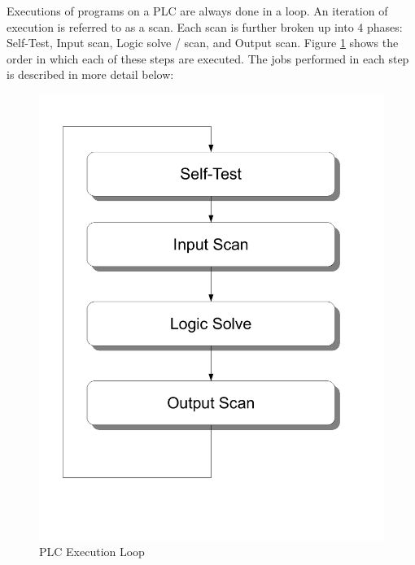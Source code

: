 \pagebreak
Executions of programs on a PLC are always done in a loop. An iteration of execution is referred to as a scan. Each scan is further broken up into 4 phases: Self-Test, Input scan, Logic solve / scan, and Output scan. Figure \ref{fig:plcexecution} shows the order in which each of these steps are executed. The jobs performed in each step is described in more detail below:
\begin{figure}[htb]
    \centering
    \includegraphics[width=\imgmedphoto]{./images/plcexecution.pdf}
    \caption{PLC Execution Loop}
    \label{fig:plcexecution}
\end{figure}

